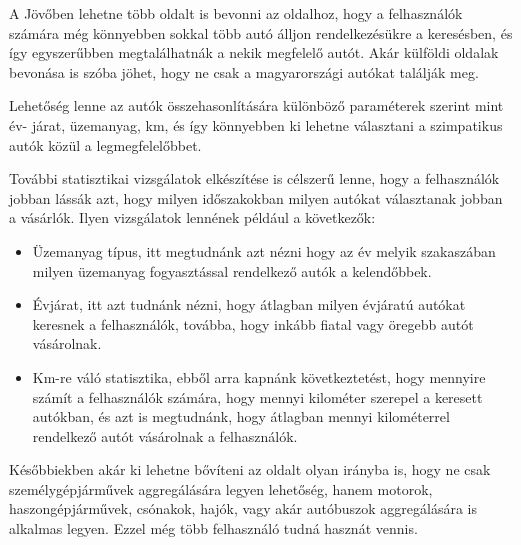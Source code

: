 

A Jövőben lehetne több oldalt is bevonni az oldalhoz, hogy a felhasználók számára még könnyebben sokkal több autó álljon rendelkezésükre a keresésben, és így egyszerűbben megtalálhatnák a nekik megfelelő autót. Akár külföldi oldalak bevonása is szóba jöhet, hogy ne csak a magyarországi autókat találják meg.


Lehetőség lenne az autók összehasonlítására különböző paraméterek szerint mint év-
járat, üzemanyag, km, és így könnyebben ki lehetne választani a szimpatikus autók közül a legmegfelelőbbet.


További statisztikai vizsgálatok elkészítése is célszerű lenne, hogy a felhasználók jobban lássák azt, hogy milyen időszakokban milyen autókat választanak jobban a vásárlók. Ilyen vizsgálatok lennének például a következők:

\begin{itemize}
\item Üzemanyag típus, itt megtudnánk azt nézni hogy az év melyik szakaszában milyen üzemanyag fogyasztással rendelkező autók a kelendőbbek.

\item Évjárat, itt azt tudnánk nézni, hogy átlagban milyen évjáratú autókat keresnek a felhasználók, továbba, hogy inkább fiatal vagy öregebb autót vásárolnak.

\item Km-re váló statisztika, ebből arra kapnánk következtetést, hogy mennyire számít a felhasználók számára, hogy mennyi kilométer szerepel a keresett autókban, és azt is megtudnánk, hogy átlagban mennyi kilométerrel rendelkező autót vásárolnak a felhasználók.
\end{itemize}


Későbbiekben akár ki lehetne bővíteni az oldalt olyan irányba is, hogy ne csak személygépjárművek aggregálására legyen lehetőség, hanem motorok, haszongépjárművek, csónakok, hajók, vagy akár autóbuszok aggregálására is alkalmas legyen. Ezzel még több felhasználó tudná hasznát vennis.